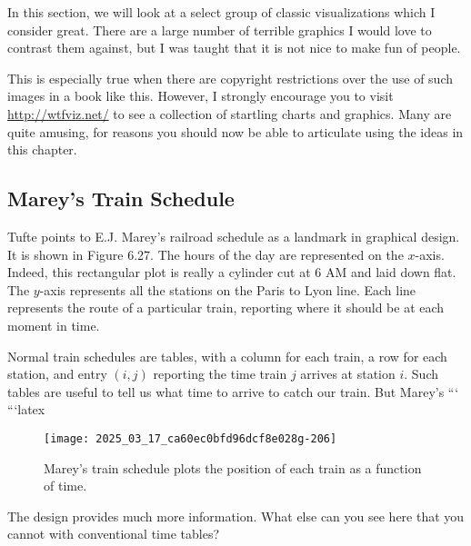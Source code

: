 \documentclass[10pt]{article}
\begin{document}
In this section, we will look at a select group of classic visualizations which I consider great. There are a large number of terrible graphics I would love to contrast them against, but I was taught that it is not nice to make fun of people.

This is especially true when there are copyright restrictions over the use of such images in a book like this. However, I strongly encourage you to visit \href{http://wtfviz.net/}{http://wtfviz.net/} to see a collection of startling charts and graphics. Many are quite amusing, for reasons you should now be able to articulate using the ideas in this chapter.

\subsection*{Marey's Train Schedule}
Tufte points to E.J. Marey's railroad schedule as a landmark in graphical design. It is shown in Figure 6.27. The hours of the day are represented on the $x$-axis. Indeed, this rectangular plot is really a cylinder cut at 6 AM and laid down flat. The $y$-axis represents all the stations on the Paris to Lyon line. Each line represents the route of a particular train, reporting where it should be at each moment in time.

Normal train schedules are tables, with a column for each train, a row for each station, and entry $(i, j)$ reporting the time train $j$ arrives at station $i$. Such tables are useful to tell us what time to arrive to catch our train. But Marey's
```
```latex
\begin{figure}[htbp]
    \centering
    \texttt{[image: 2025\_03\_17\_ca60ec0bfd96dcf8e028g-206]}
    \caption{Marey's train schedule plots the position of each train as a function of time.}
    \label{fig:marey_train_schedule}
\end{figure}

The design provides much more information. What else can you see here that you cannot with conventional time tables?
\end{document}
